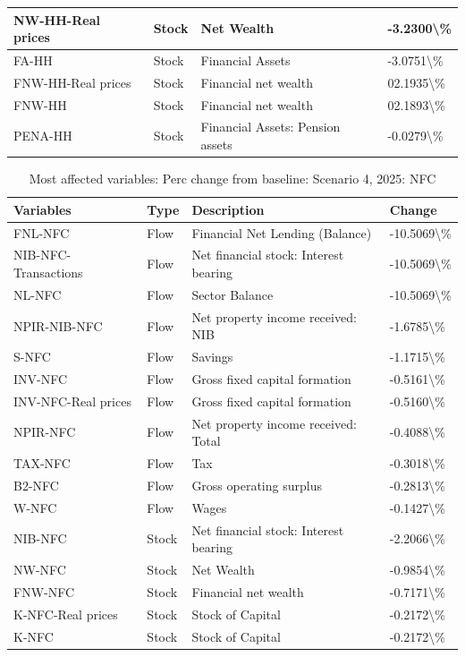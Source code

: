 \documentclass[
]{book}
\begin{document}
\begin{table}
\begin{tabular}[t]{l|l|l|l}
\hline
NW-HH-Real prices & Stock & Net Wealth & -3.2300\textbackslash{}\%\\
\hline
FA-HH & Stock & Financial Assets & -3.0751\textbackslash{}\%\\
\hline
FNW-HH-Real prices & Stock & Financial net wealth & 02.1935\textbackslash{}\%\\
\hline
FNW-HH & Stock & Financial net wealth & 02.1893\textbackslash{}\%\\
\hline
PENA-HH & Stock & Financial Assets: Pension assets & -0.0279\textbackslash{}\%\\
\hline
\end{tabular}
\end{table}

\begin{table}

\caption{\label{tab:most-affected-Scenario-4-2025-perc-NFC}Most affected variables: Perc change from baseline: Scenario 4, 2025: NFC}
\centering
\fontsize{10}{12}\selectfont
\begin{tabular}[t]{l|l|l|l}
\hline
Variables & Type & Description & Change\\
\hline
FNL-NFC & Flow & Financial Net Lending (Balance) & -10.5069\textbackslash{}\%\\
\hline
NIB-NFC-Transactions & Flow & Net financial stock: Interest bearing & -10.5069\textbackslash{}\%\\
\hline
NL-NFC & Flow & Sector Balance & -10.5069\textbackslash{}\%\\
\hline
NPIR-NIB-NFC & Flow & Net property income received: NIB & -1.6785\textbackslash{}\%\\
\hline
S-NFC & Flow & Savings & -1.1715\textbackslash{}\%\\
\hline
INV-NFC & Flow & Gross fixed capital formation & -0.5161\textbackslash{}\%\\
\hline
INV-NFC-Real prices & Flow & Gross fixed capital formation & -0.5160\textbackslash{}\%\\
\hline
NPIR-NFC & Flow & Net property income received: Total & -0.4088\textbackslash{}\%\\
\hline
TAX-NFC & Flow & Tax & -0.3018\textbackslash{}\%\\
\hline
B2-NFC & Flow & Gross operating surplus & -0.2813\textbackslash{}\%\\
\hline
W-NFC & Flow & Wages & -0.1427\textbackslash{}\%\\
\hline
NIB-NFC & Stock & Net financial stock: Interest bearing & -2.2066\textbackslash{}\%\\
\hline
NW-NFC & Stock & Net Wealth & -0.9854\textbackslash{}\%\\
\hline
FNW-NFC & Stock & Financial net wealth & -0.7171\textbackslash{}\%\\
\hline
K-NFC-Real prices & Stock & Stock of Capital & -0.2172\textbackslash{}\%\\
\hline
K-NFC & Stock & Stock of Capital & -0.2172\textbackslash{}\%\\
\hline
\end{tabular}
\end{table}
\end{document}
